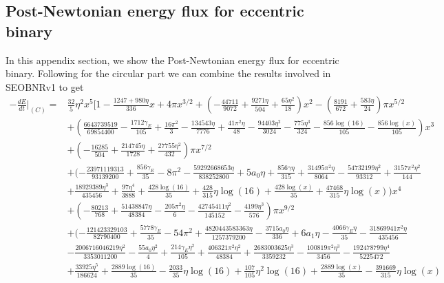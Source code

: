 \documentclass[prd,aps,a4paper,superscriptaddress,twocolumn,footinbib,showpacs]{revtex4}
\begin{document}
\begin{widetext}
\section{Post-Newtonian energy flux for eccentric binary}
\label{App:PNenergy}
In this appendix section, we show the Post-Newtonian energy flux for eccentric binary. Following \cite{PhysRevD.95.024038} for the circular part we can combine the results involved in SEOBNRv1 \cite{Cao16,PhysRevD.85.064010,PhysRevD.95.024038} to get
\begin{align}
-\frac{dE}{dt}|_{(C)}=&\frac{32}{5}\eta^2 x^5[1-\frac{1247+980\eta}{336}x+4\pi x^{3/2}+(-\frac{44711}{9072}+\frac{9271\eta}{504}+\frac{65\eta^2}{18})x^2
-(\frac{8191}{672}+\frac{583\eta}{24})\pi x^{5/2}\nonumber\\
&+(\frac{6643739519}{69854400}-\frac{1712\gamma_E}{105}+\frac{16 \pi ^2}{3}-\frac{134543 \eta }{7776}+\frac{41 \pi ^2 \eta }{48}-\frac{94403 \eta ^2}{3024}-\frac{775 \eta ^3}{324}-\frac{856 \log(16)}{105}-\frac{856 \log(x)}{105})x^3\nonumber\\
&+(-\frac{16285}{504}+\frac{214745\eta }{1728}+\frac{27755\eta ^2}{432})\pi x^{7/2}\nonumber\\
&+(-\frac{23971119313}{93139200}+\frac{856 \gamma_E}{35}-8 \pi ^2-\frac{59292668653 \eta }{838252800}+5 a_0 \eta +\frac{856 \gamma \eta }{315}+\frac{31495 \pi ^2 \eta }{8064}-\frac{54732199 \eta ^2}{93312}+\frac{3157 \pi ^2 \eta ^2}{144}\nonumber\\
&+\frac{18929389 \eta ^3}{435456}+\frac{97 \eta ^4}{3888}+\frac{428 \log(16)}{35}+\frac{428}{315} \eta  \log(16)+\frac{428 \log(x)}{35}+\frac{47468}{315} \eta  \log(x))x^4\nonumber\\
&+(-\frac{80213 }{768}+\frac{51438847  \eta }{48384}-\frac{205 \pi ^2 \eta }{6}-\frac{42745411  \eta ^2}{145152}-\frac{4199 \eta ^3}{576})\pi x^{9/2}\nonumber\\
&+(-\frac{121423329103}{82790400}+\frac{5778 \gamma_E}{35}-54 \pi ^2+\frac{4820443583363 \eta }{1257379200}-\frac{3715 a_0 \eta }{336}+6 a_1 \eta -\frac{4066 \gamma_E \eta }{35}-\frac{31869941 \pi ^2 \eta }{435456}\nonumber\\
&-\frac{2006716046219 \eta ^2}{3353011200}-\frac{55 a_0 \eta ^2}{4}+\frac{214 \gamma_E \eta ^2}{105}+\frac{406321 \pi ^2 \eta ^2}{48384}+\frac{2683003625 \eta ^3}{3359232}-\frac{100819 \pi ^2 \eta ^3}{3456}-\frac{192478799 \eta ^4}{5225472}\nonumber\\
&+\frac{33925 \eta ^5}{186624}+\frac{2889 \log(16)}{35}-\frac{2033}{35} \eta  \log(16)+\frac{107}{105} \eta ^2 \log(16)+\frac{2889 \log(x)}{35}-\frac{391669}{315} \eta  \log(x)\nonumber\\

\end{align}
\end{widetext}
\end{document}

